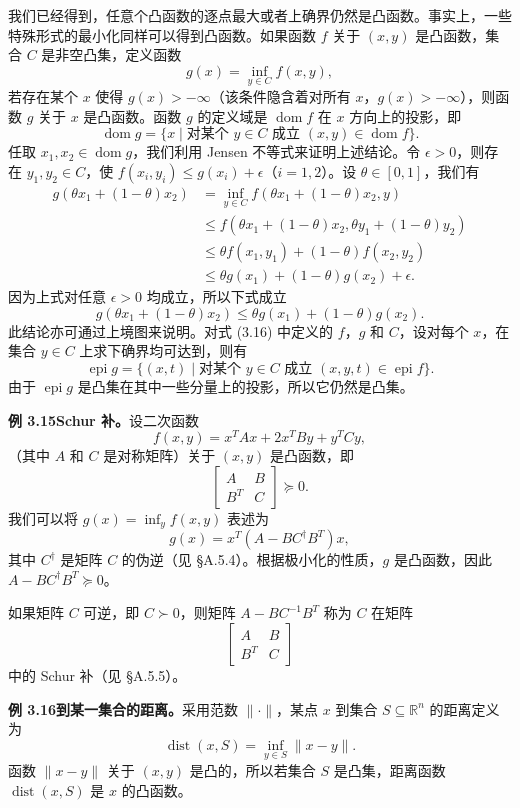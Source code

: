 \documentclass[UTF8, 12pt, fontset=fandol, oneside]{ctexart}
\DeclareMathOperator{\dom}{dom}
\DeclareMathOperator{\dist}{dist}
\DeclareMathOperator{\epi}{epi}
\begin{document}
我们已经得到，任意个凸函数的逐点最大或者上确界仍然是凸函数。事实上，一些特殊形式的最小化同样可以得到凸函数。如果函数 $f$ 关于 $(x,y)$ 是凸函数，集合 $C$ 是非空凸集，定义函数
\begin{equation}
g(x)=\inf_{y\in C} f(x,y),
\tag{3.16}
\end{equation}
若存在某个 $x$ 使得 $g(x)>-\infty$（该条件隐含着对所有 $x$，$g(x)>-\infty$），则函数 $g$ 关于 $x$ 是凸函数。函数 $g$ 的定义域是 $\dom f$ 在 $x$ 方向上的投影，即
\[
\dom g=\{x\mid \text{对某个 }y\in C\text{ 成立 }(x,y)\in\dom f\}.
\]
任取 $x_1,x_2\in\dom g$，我们利用 Jensen 不等式来证明上述结论。令 $\epsilon>0$，则存在 $y_1,y_2\in C$，使 $f(x_i,y_i)\leq g(x_i)+\epsilon$（$i=1,2$）。设 $\theta\in[0,1]$，我们有
\[
\begin{aligned}
g(\theta x_1+(1-\theta)x_2)
&=\inf_{y\in C} f(\theta x_1+(1-\theta)x_2,y)\\
&\leq f(\theta x_1+(1-\theta)x_2,\theta y_1+(1-\theta)y_2)\\
&\leq \theta f(x_1,y_1)+(1-\theta)f(x_2,y_2)\\
&\leq \theta g(x_1)+(1-\theta)g(x_2)+\epsilon.
\end{aligned}
\]
因为上式对任意 $\epsilon>0$ 均成立，所以下式成立
\[
g(\theta x_1+(1-\theta)x_2)\leq \theta g(x_1)+(1-\theta)g(x_2).
\]
此结论亦可通过上境图来说明。对式 (3.16) 中定义的 $f$，$g$ 和 $C$，设对每个 $x$，在集合 $y\in C$ 上求下确界均可达到，则有
\[
\epi g=\{(x,t)\mid \text{对某个 }y\in C\text{ 成立 }(x,y,t)\in\epi f\}.
\]
由于 $\epi g$ 是凸集在其中一些分量上的投影，所以它仍然是凸集。

\noindent\textbf{例 3.15\quad Schur 补。}\quad 设二次函数
\[
f(x,y)=x^TAx+2x^TBy+y^TCy,
\]
（其中 $A$ 和 $C$ 是对称矩阵）关于 $(x,y)$ 是凸函数，即
\[
\begin{bmatrix}
A & B\\
B^T & C
\end{bmatrix}\succeq0.
\]
我们可以将 $g(x)=\inf_y f(x,y)$ 表述为
\[
g(x)=x^T(A-BC^\dagger B^T)x,
\]
其中 $C^\dagger$ 是矩阵 $C$ 的伪逆（见 \S A.5.4）。根据极小化的性质，$g$ 是凸函数，因此 $A-BC^\dagger B^T\succeq0$。

如果矩阵 $C$ 可逆，即 $C\succ0$，则矩阵 $A-BC^{-1}B^T$ 称为 $C$ 在矩阵
\[
\begin{bmatrix}
A & B\\
B^T & C
\end{bmatrix}
\]
中的 Schur 补（见 \S A.5.5）。

\noindent\textbf{例 3.16\quad 到某一集合的距离。}\quad 采用范数 $\|\cdot\|$，某点 $x$ 到集合 $S\subseteq\mathbb{R}^n$ 的距离定义为
\[
\dist(x,S)=\inf_{y\in S}\|x-y\|.
\]
函数 $\|x-y\|$ 关于 $(x,y)$ 是凸的，所以若集合 $S$ 是凸集，距离函数 $\dist(x,S)$ 是 $x$ 的凸函数。
\end{document}
